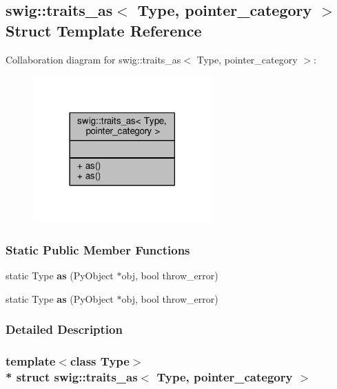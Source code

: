 \subsection{swig\+:\+:traits\+\_\+as$<$ Type, pointer\+\_\+category $>$ Struct Template Reference}
\label{structswig_1_1traits__as_3_01Type_00_01pointer__category_01_4}


Collaboration diagram for swig\+:\+:traits\+\_\+as$<$ Type, pointer\+\_\+category $>$\+:
\nopagebreak
\begin{figure}[H]
\begin{center}
\leavevmode
\includegraphics[width=194pt]{d8/d9a/structswig_1_1traits__as_3_01Type_00_01pointer__category_01_4__coll__graph}
\end{center}
\end{figure}
\subsubsection*{Static Public Member Functions}
\begin{DoxyCompactItemize}
\item 
static Type {\bf as} (Py\+Object $\ast$obj, bool throw\+\_\+error)
\item 
static Type {\bf as} (Py\+Object $\ast$obj, bool throw\+\_\+error)
\end{DoxyCompactItemize}


\subsubsection{Detailed Description}
\subsubsection*{template$<$class Type$>$\\*
struct swig\+::traits\+\_\+as$<$ Type, pointer\+\_\+category $>$}




